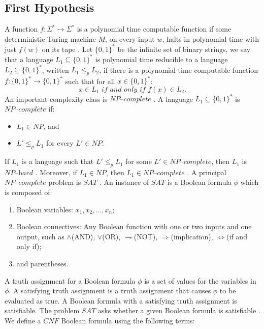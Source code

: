 \documentclass[a4paper,UKenglish,cleveref, autoref]{lipics-v2019}
\begin{document}
\subsection{First Hypothesis}

A function $f : \Sigma^{*} \rightarrow \Sigma^{*}$ is a polynomial time computable function if some deterministic Turing machine $M$, on every input $w$, halts in polynomial time with just $f(w)$ on its tape \cite{MS06}. Let $\{0, 1\}^{*}$ be the infinite set of binary strings, we say that a language $L_{1} \subseteq \{0, 1\}^{*}$ is polynomial time reducible to a language $L_{2} \subseteq \{0, 1\}^{*}$, written $L_{1} \leq_{p} L_{2}$, if there is a polynomial time computable function $f : \{0, 1\}^{*} \rightarrow \{0, 1\}^{*}$ such that for all $x \in \{0, 1\}^{*}$:
\[x \in L_{1} \textit{ if and only if } f(x) \in L_{2}.\]
An important complexity class is $\textit{NP--complete}$ \cite{GJ79}. A language $L_{1} \subseteq \{0, 1\}^{*}$ is $\textit{NP--complete}$ if:

\begin{itemize}
\item $L_{1} \in NP$, and
\item $L' \leq_{p} L_{1}$ for every $L' \in NP$.
\end{itemize}

If $L_{1}$ is a language such that $L' \leq_{p} L_{1}$ for some $L' \in \textit{NP--complete}$, then $L_{1}$ is $\textit{NP--hard}$ \cite{CLRS01}. Moreover, if $L_{1} \in NP$, then $L_{1} \in \textit{NP--complete}$ \cite{CLRS01}. A principal $\textit{NP--complete}$ problem is $SAT$ \cite{GJ79}. An instance of $SAT$ is a Boolean formula $\phi$ which is composed of:

\begin{enumerate}
\item Boolean variables: $x_{1}, x_{2},\ldots, x_{n}$;
\item Boolean connectives: Any Boolean function with one or two inputs and one output, such as $\wedge$(AND), $\vee$(OR), $\rightharpoondown$(NOT), $\Rightarrow$(implication), $\Leftrightarrow$(if and only if);
\item and parentheses.
\end{enumerate}

A truth assignment for a Boolean formula $\phi$ is a set of values for the variables in $\phi$. A satisfying truth assignment is a truth assignment that causes $\phi$ to be evaluated as true. A Boolean formula with a satisfying truth assignment is satisfiable. The problem $SAT$ asks whether a given Boolean formula is satisfiable \cite{GJ79}. We define a $CNF$ Boolean formula using the following terms:
\end{document}
